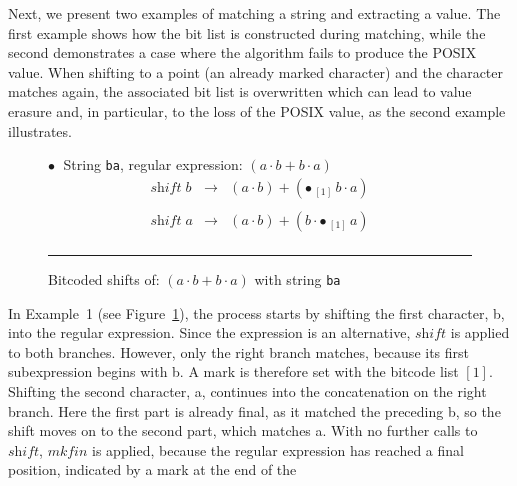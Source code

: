 \documentclass[12pt]{article}
\newcommand{\shift}{\textit{shift}}
\newcommand{\Marked}[1]{\bullet\,#1}
\newcommand{\mkfin}{\textit{mkfin}}
\begin{document}
Next, we present two examples of matching a string and extracting a value.  
The first example shows how the bit list is constructed during matching,  
while the second demonstrates a case where the algorithm fails to produce the POSIX value.
When shifting to a point (an already marked character) and the character matches again, the associated 
bit list is overwritten which can lead to value erasure and, in particular, to the loss of the POSIX value,  
as the second example illustrates.  


  \begin{figure}[ht]
    $\bullet\;$ String \texttt{ba}, regular expression: $(a \cdot b + b \cdot a)$
    \[
    \begin{array}{rcl}
      \shift\; b & \rightarrow & (a \cdot b) + (\Marked{_{[1]}\, b} \cdot a)\\\\
      \shift\; a & \rightarrow & (a \cdot b) + (b \cdot \Marked{_{[1]}\, a} )\\
    \end{array}
    \]
    \hrule

    \caption{Bitcoded shifts of: $(a \cdot b + b \cdot a)$ with string \texttt{ba}} \label{BitAnnotatedShiftExample1}
    \mbox{}

  \end{figure}
      
In Example~1 (see Figure~\ref{BitAnnotatedShiftExample1}), the process starts by shifting the
first character, b, into the regular expression. Since the expression is an alternative, $\shift$ is
applied to both branches. However, only the right branch matches, because its first subexpression
begins with b. A mark is therefore set with the bitcode list $[1]$. Shifting the second character, a,
continues into the concatenation on the right branch. Here the first part is already final, as it
matched the preceding b, so the shift moves on to the second part, which matches a. With no further
calls to $\shift$, $\mkfin$ is applied, because the regular expression has reached a final position,
indicated by a mark at the end of the
\end{document}
